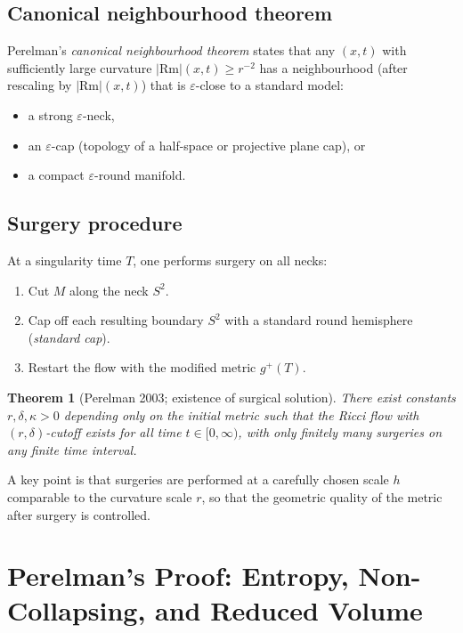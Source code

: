 \documentclass[12pt,a4paper]{amsart}
\newtheorem{theorem}{Theorem}[section]
\theoremstyle{definition}
\theoremstyle{remark}
\newcommand{\Rm}{\mathrm{Rm}}
\begin{document}
\subsection{Canonical neighbourhood theorem}

Perelman's \emph{canonical neighbourhood theorem} states that any
$(x,t)$ with sufficiently large curvature $|{\Rm}|(x,t) \geq r^{-2}$
has a neighbourhood (after rescaling by $|{\Rm}|(x,t)$) that is
$\varepsilon$-close to a standard model:
\begin{itemize}
  \item a strong $\varepsilon$-neck,
  \item an $\varepsilon$-cap (topology of a half-space or projective plane
    cap), or
  \item a compact $\varepsilon$-round manifold.
\end{itemize}

\subsection{Surgery procedure}

At a singularity time $T$, one performs surgery on all necks:
\begin{enumerate}
  \item Cut $M$ along the neck $S^2$.
  \item Cap off each resulting boundary $S^2$ with a standard round
    hemisphere (\emph{standard cap}).
  \item Restart the flow with the modified metric $g^+(T)$.
\end{enumerate}

\begin{theorem}[Perelman 2003; existence of surgical solution]
\label{thm:surgery}
There exist constants $r, \delta, \kappa > 0$ depending only on the initial
metric such that the Ricci flow with $(r,\delta)$-cutoff exists for all time
$t \in [0,\infty)$, with only finitely many surgeries on any finite time
interval.
\end{theorem}

A key point is that surgeries are performed at a carefully chosen scale $h$
comparable to the curvature scale $r$, so that the geometric quality of the
metric after surgery is controlled.


\section{Perelman's Proof: Entropy, Non-Collapsing, and Reduced Volume}
\label{sec:perelman}
\end{document}
